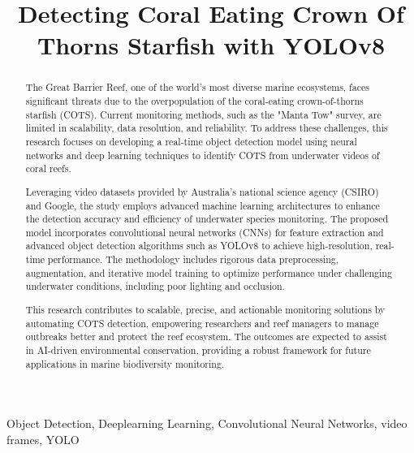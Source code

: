 \documentclass[conference]{IEEEtran}
\begin{document}
\title{Detecting Coral Eating Crown Of Thorns Starfish with YOLOv8}

\author{
}

\maketitle

\begin{abstract}
The Great Barrier Reef, one of the world's most diverse marine ecosystems, faces significant threats due to the overpopulation of the coral-eating crown-of-thorns starfish (COTS). Current monitoring methods, such as the "Manta Tow" survey, are limited in scalability, data resolution, and reliability. To address these challenges, this research focuses on developing a real-time object detection model using neural networks and deep learning techniques to identify COTS from underwater videos of coral reefs.

Leveraging video datasets provided by Australia’s national science agency (CSIRO\cite{csiro}) and Google, the study employs advanced machine learning architectures to enhance the detection accuracy and efficiency of underwater species monitoring. The proposed model incorporates convolutional neural networks (CNNs) for feature extraction and advanced object detection algorithms such as YOLOv8 to achieve high-resolution, real-time performance. The methodology includes rigorous data preprocessing, augmentation, and iterative model training to optimize performance under challenging underwater conditions, including poor lighting and occlusion.

This research contributes to scalable, precise, and actionable monitoring solutions by automating COTS detection, empowering researchers and reef managers to manage outbreaks better and protect the reef ecosystem. The outcomes are expected to assist in AI-driven environmental conservation, providing a robust framework for future applications in marine biodiversity monitoring.
\end{abstract}

\begin{IEEEkeywords}
Object Detection, Deeplearning Learning, Convolutional Neural Networks, video frames, YOLO
\end{IEEEkeywords}
\end{document}
